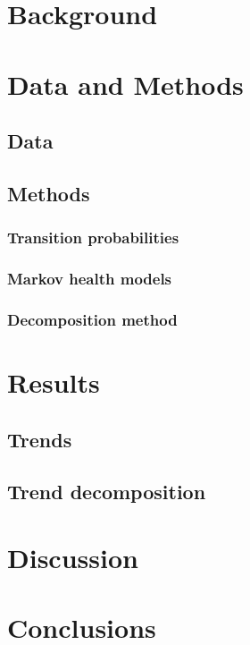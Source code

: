 \section{Background}
\section{Data and Methods}
\subsection{Data}
\subsection{Methods}
\subsubsection{Transition probabilities}
\subsubsection{Markov health models}
\subsubsection{Decomposition method}
\section{Results}
\subsection{Trends}
\subsection{Trend decomposition}
\section{Discussion}
\section{Conclusions}


  

